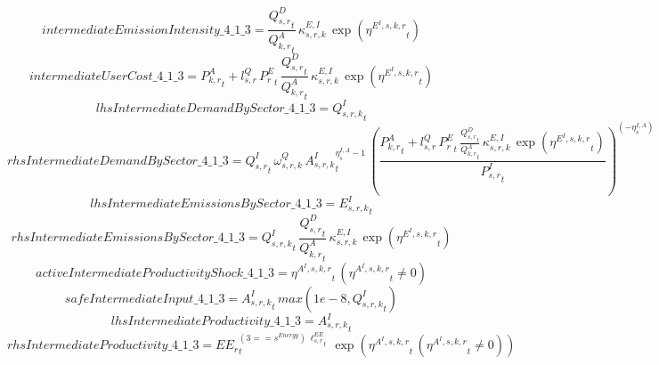 \begin{dmath*}
intermediateEmissionIntensity\_4\_1\_3 = \frac{{{Q^{D}_{s,r}}}_{t}}{{{Q^{A}_{k,r}}}_{t}}\, {{\kappa^{E,I}_{s,r,k}}}\, \exp\left({{\eta^{E^{I},s,k,r}}}_{t}\right)
\end{dmath*}
\begin{dmath*}
intermediateUserCost\_4\_1\_3 = {{P^{A}_{k,r}}}_{t}+{{l^{Q}_{s,r}}}\, {{P^E_r}}_{t}\, \frac{{{Q^{D}_{s,r}}}_{t}}{{{Q^{A}_{k,r}}}_{t}}\, {{\kappa^{E,I}_{s,r,k}}}\, \exp\left({{\eta^{E^{I},s,k,r}}}_{t}\right)
\end{dmath*}
\begin{dmath*}
lhsIntermediateDemandBySector\_4\_1\_3 = {{Q^{I}_{s,r,k}}}_{t}
\end{dmath*}
\begin{dmath*}
rhsIntermediateDemandBySector\_4\_1\_3 = {{Q^{I}_{s,r}}}_{t}\, {{\omega^{Q}_{s,r,k}}}\, {{A^{I}_{s,r,k}}}_{t}^{{{\eta^{I,A}_{s}}}-1}\, \left(\frac{{{P^{A}_{k,r}}}_{t}+{{l^{Q}_{s,r}}}\, {{P^E_r}}_{t}\, \frac{{{Q^{D}_{s,r}}}_{t}}{{{Q^{A}_{k,r}}}_{t}}\, {{\kappa^{E,I}_{s,r,k}}}\, \exp\left({{\eta^{E^{I},s,k,r}}}_{t}\right)}{{{P^{I}_{s,r}}}_{t}}\right)^{\left(-{{\eta^{I,A}_{s}}}\right)}
\end{dmath*}
\begin{dmath*}
lhsIntermediateEmissionsBySector\_4\_1\_3 = {{E^I_{s,r,k}}}_{t}
\end{dmath*}
\begin{dmath*}
rhsIntermediateEmissionsBySector\_4\_1\_3 = {{Q^{I}_{s,r,k}}}_{t}\, \frac{{{Q^{D}_{s,r}}}_{t}}{{{Q^{A}_{k,r}}}_{t}}\, {{\kappa^{E,I}_{s,r,k}}}\, \exp\left({{\eta^{E^{I},s,k,r}}}_{t}\right)
\end{dmath*}
\begin{dmath*}
activeIntermediateProductivityShock\_4\_1\_3 = {{\eta^{A^{I},s,k,r}}}_{t}\, \left({{\eta^{A^{I},s,k,r}}}_{t}\neq 0\right)
\end{dmath*}
\begin{dmath*}
safeIntermediateInput\_4\_1\_3 = {{A^{I}_{s,r,k}}}_{t}\, max(1e-8,{{Q^{I}_{s,r,k}}}_{t})
\end{dmath*}
\begin{dmath*}
lhsIntermediateProductivity\_4\_1\_3 = {{A^{I}_{s,r,k}}}_{t}
\end{dmath*}
\begin{dmath*}
rhsIntermediateProductivity\_4\_1\_3 = {{EE_r}}_{t}^{\left(3=={{s^{Energy}}}\right)\, {{\ell^{EE}_{s,r}}}_{t}}\, \exp\left({{\eta^{A^{I},s,k,r}}}_{t}\, \left({{\eta^{A^{I},s,k,r}}}_{t}\neq 0\right)\right)
\end{dmath*}
